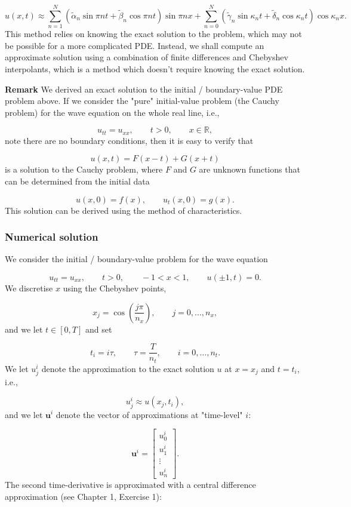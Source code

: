\documentclass[12pt,a4paper]{article}
\begin{document}
\[
u(x,t) \approx \sum_{n = 1}^{N} \left(\tilde{\alpha}_n\sin\pi n t + \tilde{\beta}_n\cos\pi n t  \right)\sin\pi n x +  \sum_{n = 0}^{N} \left(\tilde{\gamma}_n\sin \kappa_n t + \tilde{\delta}_n\cos \kappa_n t  \right)\cos\kappa_n x.
\]
This method relies on knowing the exact solution to the problem, which may not be possible for a more complicated PDE. Instead, we shall compute an approximate solution using a combination of finite differences and Chebyshev interpolants, which is a method which doesn't require knowing the exact solution.

\textbf{Remark} We derived an exact solution to the initial / boundary-value PDE problem above.  If we consider the "pure" initial-value problem (the Cauchy problem) for the wave equation on the whole real line, i.e., 

\[
u_{tt} = u_{xx}, \qquad t > 0, \qquad x \in \mathbb{R},
\]
note there are no boundary conditions, then it is easy to verify that 

\[
u(x,t) = F(x-t) + G(x+t)
\]
is a solution to the Cauchy problem, where $F$ and $G$ are unknown functions that can be determined from the initial data

\[
u(x,0) = f(x), \qquad u_t(x,0) = g(x).
\]
This solution can be derived using the method of characteristics. 

\subsubsection{Numerical solution}
We consider the initial / boundary-value problem for the wave equation

\[
u_{tt} = u_{xx}, \qquad t > 0, \qquad -1 < x < 1, \qquad u(\pm 1, t) = 0.
\]
We discretise $x$ using the Chebyshev points,

\[
x_j =  \cos\left(  \frac{j\pi}{n_x}\right), \qquad j = 0, \ldots, n_x, 
\]
and we let $t \in [0, T]$ and set

\[
t_i = i\tau, \qquad \tau = \frac{T}{n_t}, \qquad i = 0, \ldots, n_t.
\]
We let $u^{i}_j$ denote the approximation to the exact solution $u$ at $x=x_j$ and $t = t_i$, i.e.,

\[
u^{i}_j \approx u(x_j, t_i),
\]
and we let $\mathbf{u}^{i}$ denote the vector of approximations at "time-level" $i$:

\[
\mathbf{u}^{i} = \begin{bmatrix}
u^{i}_0 \\
u^{i}_1 \\
\vdots \\
u^{i}_n
\end{bmatrix}.
\]
The second time-derivative is approximated with a central difference approximation (see Chapter 1, Exercise 1):
\end{document}

